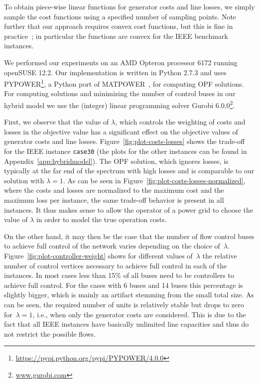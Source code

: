\documentclass{article}[11pt,a4paper]
\begin{document}
 To obtain piece-wise linear functions for generator costs and line
 losses, we simply sample the cost functions using a specified number
 of sampling points.  Note further that our approach requires convex
 cost functions, but this is fine in practice~\cite{wood1996power}; in
 particular the functions are convex for the IEEE benchmark instances.

We performed our experiments on an AMD Opteron processor 6172 running
 openSUSE 12.2. Our implementation is written in Python 2.7.3 and uses
 PYPOWER\footnote{\url{https://pypi.python.org/pypi/PYPOWER/4.0.0}}, a
 Python port of MATPOWER~\cite{Zimmerman2009,Zimmerman2011a}, for
 computing OPF solutions.  For computing solutions and minimizing the
 number of control buses in our hybrid model we use the (integer)
 linear programming solver Gurobi
 6.0.0\footnote{\url{www.gurobi.com}}.

 First, we observe that the value of $\lambda$, which controls the
 weighting of costs and losses in the objective value has a
 significant effect on the objective values of generator costs and
 line losses.  
 Figure~\ref{fig:plot-costs-losses} shows the trade-off for the IEEE
 instance \texttt{case30} (the plots for the other instances can be
 found in Appendix~\ref{app:hybridmodel}).  The OPF solution, which
 ignores losses, is typically at the far end of the spectrum with high
 losses and is comparable to our solution with $\lambda = 1$.  As can
 be seen in Figure~\ref{fig:plot-costs-losses-normalized}, where the
 costs and losses are normalized to the maximum cost and the maximum
 loss per instance, the same trade-off behavior is present in all
 instances.  It thus makes sense to allow the operator of a power grid
 to choose the value of $\lambda$ in order to model the true operation
 costs.

On the other hand, it may then be the case that the number of flow control buses to achieve full control of the network varies depending on the
choice of~$\lambda$.  Figure~\ref{fig:plot-controller-weight} shows
for different values of~$\lambda$ the relative number of control
vertices necessary to achieve full control in each of the instances.
In most cases less than 15\% of all buses need to be controllers to
achieve full control.  For the cases with 6 buses and 14 buses this
percentage is slightly bigger, which is mainly an artifact stemming
from the small total size.  As can be seen, the required number of
units is relatively stable but drops to zero for~$\lambda = 1$,
i.e., when only the generator costs are considered. This is due to the fact that all IEEE instances have basically unlimited line capacities and thus do not restrict the possible flows.
\end{document}
